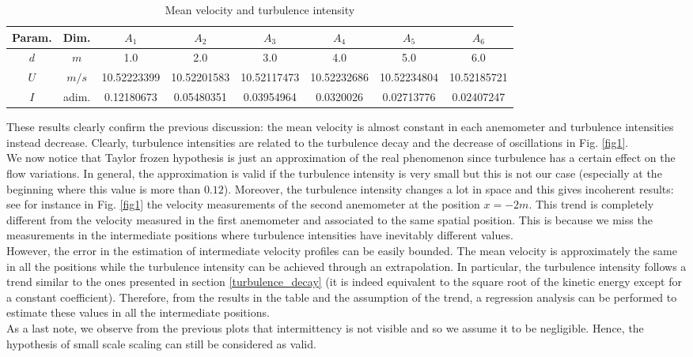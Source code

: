 \documentclass[11pt,titlepage]{article}
\begin{document}
\begin{table} [h]
\centering
\caption{Mean velocity and turbulence intensity} \label{table1}
    \begin{tabular}{ | c | c | c | c | c | c | c | c |}
        \hline
        Param. & Dim. & $A_1$ & $A_2$ & $A_3$ & $A_4$ & $A_5$ & $A_6$ \\
        \hline
        $d$ & $m$ & 1.0 & 2.0 & 3.0 & 4.0 & 5.0 & 6.0 \\
        \hline
        $U$ & $m/s$&10.52223399 &10.52201583&10.52117473 &10.52232686& 10.52234804& 10.52185721 \\
        \hline
        $I$ & adim.& 0.12180673& 0.05480351& 0.03954964 &0.0320026  &0.02713776& 0.02407247 \\
        \hline
    \end{tabular}
\end{table}
These results clearly confirm the previous discussion: the mean velocity is almost constant in each anemometer and turbulence intensities instead decrease. Clearly, turbulence intensities are related to the turbulence decay and the decrease of oscillations in Fig. \ref{fig1}. \\
We now notice that Taylor frozen hypothesis is just an approximation of the real phenomenon since turbulence has a certain effect on the flow variations. In general, the approximation is valid if the turbulence intensity is very small but this is not our case (especially at the beginning where this value is more than $0.12$). Moreover, the turbulence intensity changes a lot in space and this gives incoherent results: see for instance in Fig. \ref{fig1} the velocity measurements of the second anemometer at the position $x=-2m$. This trend is completely different from the velocity measured in the first anemometer and associated to the same spatial position. This is because we miss the measurements in the intermediate positions where turbulence intensities have inevitably different values. \\
However, the error in the estimation of intermediate velocity profiles can be easily bounded. The mean velocity is approximately the same in all the positions while the turbulence intensity can be achieved through an extrapolation. In particular, the turbulence intensity follows a trend similar to the ones presented in section \ref{turbulence_decay} (it is indeed equivalent to the square root of the kinetic energy except for a constant coefficient). Therefore, from the results in the table and the assumption of the trend, a regression analysis can be performed to estimate these values in all the intermediate positions. \\
As a last note, we observe from the previous plots that intermittency is not visible and so we assume it to be negligible. Hence, the hypothesis of small scale scaling can still be considered as valid.
\end{document}
